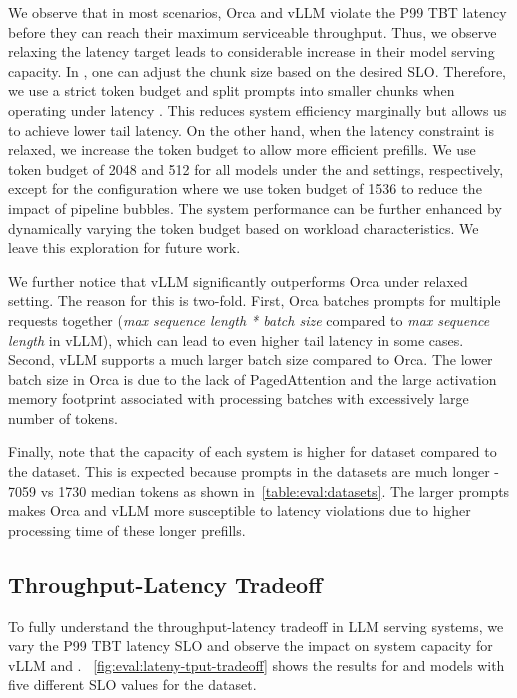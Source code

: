 We observe that in most scenarios, Orca and vLLM violate the P99 TBT latency \slo before they can reach their maximum serviceable throughput. Thus, we observe relaxing the latency target leads to considerable increase in their model serving capacity. In \sysname, one can adjust the chunk size based on the desired SLO. Therefore, we use a strict token budget and split prompts into smaller chunks when operating under \strict latency \slo. This reduces system efficiency marginally but allows us to achieve lower tail latency. On the other hand, when the latency constraint is relaxed, we increase the token budget to allow more efficient prefills. We use token budget of 2048 and 512 for all models under the \relaxed and \strict settings,  respectively, except for the \llamaL \relaxed configuration where we use token budget of 1536 to reduce the impact of pipeline bubbles. The system performance can be further enhanced by dynamically varying the token budget based on workload characteristics. We leave this exploration for future work.


We further notice that vLLM significantly outperforms Orca under relaxed setting. The reason for this is two-fold. First, Orca batches prompts for multiple requests together ({\it max sequence length * batch size} compared to {\it max sequence length} in vLLM), which can lead to even higher tail latency in some cases. Second, vLLM supports a much larger batch size compared to Orca. The lower batch size in Orca is due to the lack of PagedAttention and the large activation memory footprint associated with processing batches with excessively large number of tokens.

Finally, note that the capacity of each system is higher for \sharegpt dataset compared to the \arxivsum dataset. This is expected because prompts in the \arxivsum datasets are much longer - 7059 vs 1730 median tokens as shown in~\autoref{table:eval:datasets}. The larger prompts makes Orca and vLLM more susceptible to latency violations due to higher processing time of these longer prefills.%



 \subsection{Throughput-Latency Tradeoff}
\label{subsec-tput-latency}

To fully understand the throughput-latency tradeoff in LLM serving systems, we vary the P99 TBT latency SLO and observe the impact on system capacity for vLLM and \sysname. ~\autoref{fig:eval:lateny-tput-tradeoff} shows the results for \mistral and \yi models with five different SLO values for the \sharegpt dataset.


